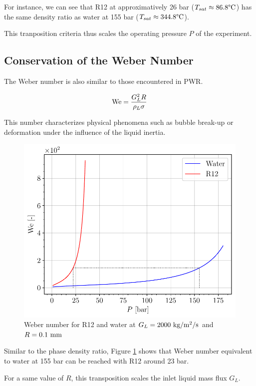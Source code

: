 For instance, we can see that R12 at approximatively 26 bar ($T_{sat} \approx 86.8 \degree\mathrm{C}$) has the same density ratio as water at 155 bar ($T_{sat} \approx 344.8 \degree\mathrm{C}$).

\npar

\begin{note*}{}
This tranposition criteria thus scales the operating pressure $P$ of the experiment.
\end{note*}

\subsection{Conservation of the Weber Number}

The Weber number is also similar to those encountered in PWR.

\begin{equation}
\mathrm{We} = \dfrac{G_{L}^{2}R}{\rho_{L} \sigma}
\end{equation}

This number characterizes physical phenomena such as bubble break-up or deformation under the influence of the liquid inertia.

\begin{figure}[!h]
\centering
\includegraphics[width=0.6\linewidth]{img/DEBORA/We_R12_PWR.pdf}
\caption{Weber number for R12 and water at $G_{L}=2000~\text{kg/m$^{2}$/s}$ and $R=0.1~\mathrm{mm}$}
\label{fig:We_R12_PWR}
\end{figure}

Similar to the phase density ratio, Figure \ref{fig:We_R12_PWR} shows that Weber number equivalent to water at 155 bar can be reached with  R12 around 23 bar.

\npar

\begin{note*}{}
For a same value of $R$, this transposition scales the inlet liquid mass flux $G_{L}$.
\end{note*}

